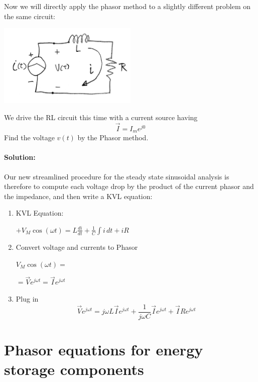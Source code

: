 Now we will directly apply the phasor method to a slightly different problem on
the same circuit:




\begin{ExampleSmall}


\includegraphics[width=0.5\textwidth]{figsChapt02/ND14529.png}

We drive the RL circuit this time with a current source having
\[
\vec{I} = I_me^{j0}
\]
Find the voltage $v(t)$ by the Phasor method.

\paragraph{Solution:}

Our new streamlined procedure for the steady state sinusoidal analysis is therefore
to compute each voltage drop by the product of the current phasor and the impedance,
and then write a KVL equation:
\begin{enumerate}
\item KVL Equation:

$+V_M\cos(\omega t) = L\frac{di}{dt} + \frac{1}{C}\int i\,dt + iR$

\item Convert voltage and currents to Phasor

$V_M\cos(\omega t) =$

$= \vec{V}e^{j\omega t} = \vec{I}e^{j\omega t}$

\item Plug in
\[
\vec{V}e^{j\omega t} = j\omega L\vec{I}e^{j\omega t} + \frac{1}{j\omega C}\vec{I}e^{j\omega t} + \vec{I}Re^{j\omega t}
\]


\end{enumerate}

\end{ExampleSmall}


\section{Phasor equations for energy storage components}


